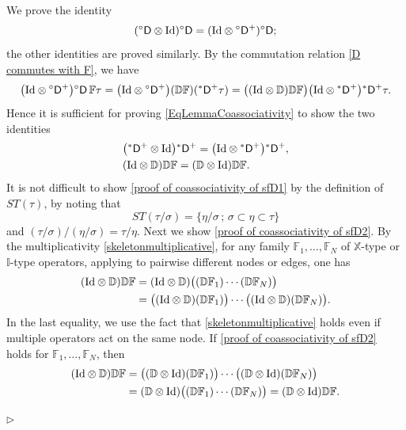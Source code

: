 \documentclass[10pt, reqno]{amsart}
\numberwithin{subsection}{section}
\numberwithin{subsubsection}{subsection}
\numberwithin{equation}{section} %
\newenvironment{Dem}[1][\unskip]{%
    \begin{list}{\hspace{1.15cm}{\sf \textbf{{\small Proof #1 --}}}}{%
        \setlength{\topsep}{0pt}%
        \setlength{\leftmargin}{0pt}%
        \setlength{\rightmargin}{0pt}%
        \setlength{\listparindent}{0pt}%
        \setlength{\itemindent}{0pt}%
        \setlength{\parsep}{0pt}%
        \addtolength{\leftmargin}{0pt}%
        \addtolength{\rightmargin}{0pt}%
    } \item }{\hfill $\rhd$\end{list}\smallskip}
\theoremstyle{mystyle}
\theoremstyle{mystyle2}
\theoremstyle{mystyle3}
\newcommand{\iden}{\text{\rm Id}}
\newcommand{\bbF}{\mathbb{F}}
\newcommand{\bbD}{\mathbb{D}}
\newcommand{\sfD}{\mathsf{D}}
\newcommand\bbI{\mathbb{I}}
\newcommand{\bbX}{\mathbb{X}}
\begin{document}
\begin{Dem}
We prove the identity
\begin{align} \label{EqLemmaCoassociativity}
({^\circ}\sfD\otimes\text{\rm Id}){^\circ}\sfD = (\text{\rm Id}\otimes{^\circ}\sfD^+){^\circ}\sfD;
\end{align}
the other identities are proved similarly. By the commutation relation \eqref{D commutes with F}, we have
\begin{align*}
\big(\iden\otimes{^\circ}{\sf D}^+\big){^\circ}{\sf D}\, \bbF\tau
= \big(\iden\otimes{^\circ}{\sf D}^+\big)(\bbD\bbF)({^*}{\sf D}^+\tau)
= \big((\iden\otimes\bbD)\bbD\bbF\big)\big(\iden\otimes{^*}{\sf D}^+\big){^*}{\sf D}^+\tau.
\end{align*}
Hence it is sufficient for proving \eqref{EqLemmaCoassociativity} to show 
the two identities
\begin{align}
\label{proof of coassociativity of sfD1}&\big({^*}{\sf D}^+\otimes\text{\rm Id}\big){^*}{\sf D}^+ = \big(\text{\rm Id}\otimes{^*}{\sf D}^+\big){^*}{\sf D}^+,   \\
\label{proof of coassociativity of sfD2}&(\iden\otimes\bbD)\bbD\bbF=(\bbD\otimes\iden)\bbD\bbF.
\end{align}
It is not difficult to show \eqref{proof of coassociativity of sfD1} by the definition of $ST(\tau)$, by noting that
$$
ST(\tau/\sigma) = \big\{\eta/\sigma\,;\,\sigma\subset\eta\subset\tau\big\}
$$
and $(\tau/\sigma)/(\eta/\sigma)=\tau/\eta$. Next we show \eqref{proof of coassociativity of sfD2}. By the multiplicativity \eqref{skeletonmultiplicative}, for any family $\bbF_1,\dots,\bbF_N$ of $\bbX$-type or $\bbI$-type operators, applying to pairwise different nodes or edges, one has
\begin{align*}
(\iden\otimes\bbD)\bbD\bbF
&=(\iden\otimes\bbD)\big((\bbD\bbF_1)\cdots(\bbD\bbF_N)\big)\\
&=\big((\iden\otimes\bbD)(\bbD\bbF_1)\big)\cdots\big((\iden\otimes\bbD)(\bbD\bbF_N)\big).
\end{align*}
In the last equality, we use the fact that \eqref{skeletonmultiplicative} holds even if multiple operators act on the same node.
If \eqref{proof of coassociativity of sfD2} holds for $\bbF_1,\dots,\bbF_N$, then
\begin{align*}
(\iden\otimes\bbD)\bbD\bbF
&=\big((\bbD\otimes\iden)(\bbD\bbF_1)\big)\cdots\big((\bbD\otimes\iden)(\bbD\bbF_N)\big)\\
&=(\bbD\otimes\iden)\big((\bbD\bbF_1)\cdots(\bbD\bbF_N)\big)=(\bbD\otimes\iden)\bbD\bbF.
\end{align*}

\end{Dem}
\end{document}
